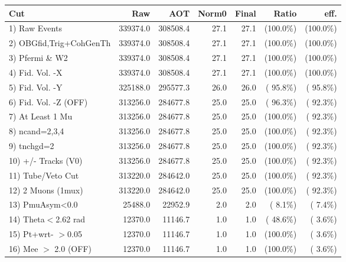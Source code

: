  \begin{table}[h!]\centering
 \begin{tabular}{||l||r|r|r|r|r|r||}
 \hline
 \hline
 Cut & Raw & AOT & Norm0 & Final & Ratio & eff.       \\
 \hline
  1) Raw Events           &     339374.0 &     308508.4 &         27.1 &         27.1 & (100.0\%) & (100.0\%) \\
  2) OBGfid,Trig+CohGenTh &     339374.0 &     308508.4 &         27.1 &         27.1 & (100.0\%) & (100.0\%) \\
  3) Pfermi \& W2         &     339374.0 &     308508.4 &         27.1 &         27.1 & (100.0\%) & (100.0\%) \\
  4) Fid. Vol. -X         &     339374.0 &     308508.4 &         27.1 &         27.1 & (100.0\%) & (100.0\%) \\
  5) Fid. Vol. -Y         &     325188.0 &     295577.3 &         26.0 &         26.0 & ( 95.8\%) & ( 95.8\%) \\
  6) Fid. Vol. -Z (OFF)   &     313256.0 &     284677.8 &         25.0 &         25.0 & ( 96.3\%) & ( 92.3\%) \\
  7) At Least 1 Mu        &     313256.0 &     284677.8 &         25.0 &         25.0 & (100.0\%) & ( 92.3\%) \\
  8) ncand=2,3,4          &     313256.0 &     284677.8 &         25.0 &         25.0 & (100.0\%) & ( 92.3\%) \\
  9) tnchgd=2             &     313256.0 &     284677.8 &         25.0 &         25.0 & (100.0\%) & ( 92.3\%) \\
 10) +/- Tracks (V0)      &     313256.0 &     284677.8 &         25.0 &         25.0 & (100.0\%) & ( 92.3\%) \\
 11) Tube/Veto Cut        &     313220.0 &     284642.0 &         25.0 &         25.0 & (100.0\%) & ( 92.3\%) \\
 12) 2 Muons (1mux)       &     313220.0 &     284642.0 &         25.0 &         25.0 & (100.0\%) & ( 92.3\%) \\
 13) PmuAsym<0.0          &      25488.0 &      22952.9 &          2.0 &          2.0 & (  8.1\%) & (  7.4\%) \\
 14) Theta$<$2.62 rad     &      12370.0 &      11146.7 &          1.0 &          1.0 & ( 48.6\%) & (  3.6\%) \\
 15) Pt+wrt- $>$0.05      &      12370.0 &      11146.7 &          1.0 &          1.0 & (100.0\%) & (  3.6\%) \\
 16) Mee $>$ 2.0  (OFF)   &      12370.0 &      11146.7 &          1.0 &          1.0 & (100.0\%) & (  3.6\%) \\

\end{tabular}
\end{table}
